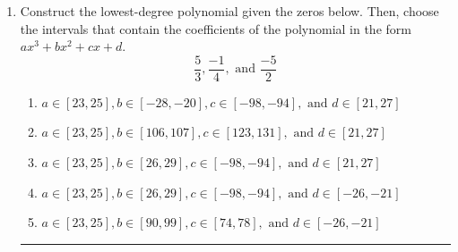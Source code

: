 \documentclass[14pt]{extbook}
\newcommand{\litem}[1]{\item#1\hspace*{-1cm}\rule{\textwidth}{0.4pt}}
\begin{document}
\begin{enumerate}
\litem{
Construct the lowest-degree polynomial given the zeros below. Then, choose the intervals that contain the coefficients of the polynomial in the form $ax^3+bx^2+cx+d$.\[ \frac{5}{3}, \frac{-1}{4}, \text{ and } \frac{-5}{2} \]\begin{enumerate}[label=\Alph*.]
\item \( a \in [23, 25], b \in [-28, -20], c \in [-98, -94], \text{ and } d \in [21, 27] \)
\item \( a \in [23, 25], b \in [106, 107], c \in [123, 131], \text{ and } d \in [21, 27] \)
\item \( a \in [23, 25], b \in [26, 29], c \in [-98, -94], \text{ and } d \in [21, 27] \)
\item \( a \in [23, 25], b \in [26, 29], c \in [-98, -94], \text{ and } d \in [-26, -21] \)
\item \( a \in [23, 25], b \in [90, 99], c \in [74, 78], \text{ and } d \in [-26, -21] \)


\end{enumerate}}
\end{enumerate}
\end{document}
